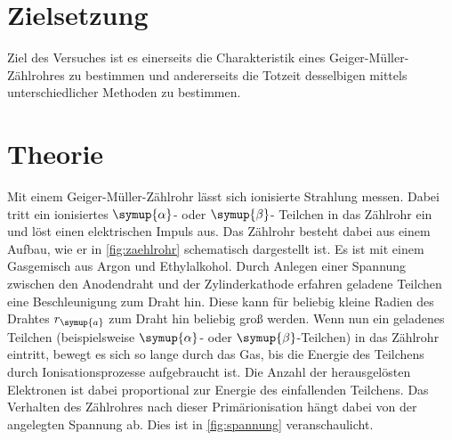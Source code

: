 \section{Zielsetzung}
Ziel des Versuches ist es einerseits die Charakteristik eines Geiger-Müller-Zählrohres zu bestimmen und andererseits die Totzeit desselbigen
mittels unterschiedlicher Methoden zu bestimmen. 
\section{Theorie}
\label{sec:Theorie}
Mit einem Geiger-Müller-Zählrohr lässt sich ionisierte Strahlung messen. Dabei tritt ein ionisiertes $\symup{\alpha}$- oder $\symup{\beta}$-
Teilchen in das Zählrohr ein und löst einen elektrischen Impuls aus. Das Zählrohr besteht dabei aus einem Aufbau, wie er in \autoref{fig:zaehlrohr}
schematisch dargestellt ist. Es ist mit einem Gasgemisch aus Argon und Ethylalkohol. Durch Anlegen einer Spannung zwischen den Anodendraht und
der Zylinderkathode erfahren geladene Teilchen eine Beschleunigung zum Draht hin. Diese kann für beliebig kleine Radien des Drahtes
$r_{\symup{a}}$ zum Draht hin beliebig groß werden.
Wenn nun ein geladenes Teilchen (beispielsweise $\symup{\alpha}$- oder $\symup{\beta}$-Teilchen) in das Zählrohr eintritt, bewegt es sich so 
lange durch das Gas, bis die Energie des Teilchens durch Ionisationsprozesse aufgebraucht ist. Die Anzahl der herausgelösten Elektronen
ist dabei proportional zur Energie des einfallenden Teilchens.
Das Verhalten des Zählrohres nach dieser Primärionisation hängt dabei von der angelegten Spannung ab. Dies ist in \autoref{fig:spannung}
veranschaulicht.